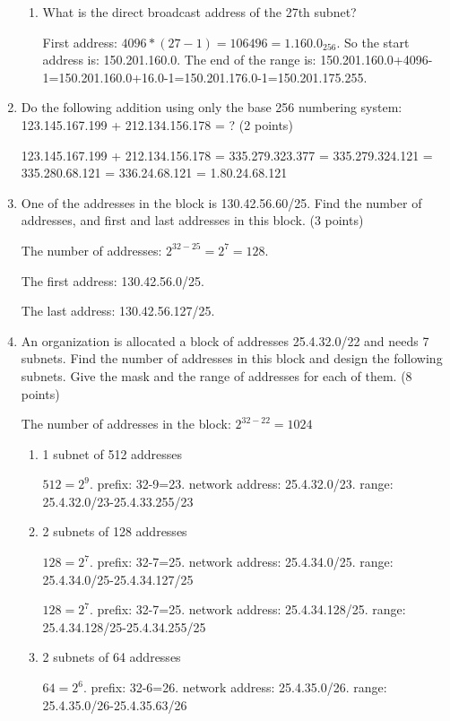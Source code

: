 \documentclass{article}
\begin{document}
\begin{enumerate}
\begin{enumerate}
    \item What is the direct broadcast address of the 27th subnet?
    
    First address: $4096*(27-1)=106496=1.160.0_{256}$. So the start address is: 150.201.160.0.
    The end of the range is: 150.201.160.0+4096-1=150.201.160.0+16.0-1=150.201.176.0-1=150.201.175.255.
  \end{enumerate}

  \item Do the following addition using only the base 256 numbering system: 123.145.167.199 + 212.134.156.178 = ? (2 points)

  123.145.167.199 + 212.134.156.178 = 335.279.323.377 = 335.279.324.121 = 335.280.68.121 = 336.24.68.121 = 1.80.24.68.121

  \item One of the addresses in the block is 130.42.56.60/25. Find the number of addresses, and first and last addresses in this block. (3 points)

  The number of addresses: $2^{32-25}=2^7=128$.

  The first address: 130.42.56.0/25.

  The last address: 130.42.56.127/25.

  \item An organization is allocated a block of addresses 25.4.32.0/22 and needs 7 subnets.
  Find the number of addresses in this block and design the following subnets.
  Give the mask and the range of addresses for each of them. (8 points)

  The number of addresses in the block: $2^{32-22}=1024$
  \begin{enumerate}
    \item 1 subnet of 512 addresses

    $512=2^{9}$. prefix: 32-9=23. network address: 25.4.32.0/23. range: 25.4.32.0/23-25.4.33.255/23

    \item 2 subnets of 128 addresses

    $128=2^{7}$. prefix: 32-7=25. network address: 25.4.34.0/25. range: 25.4.34.0/25-25.4.34.127/25

    $128=2^{7}$. prefix: 32-7=25. network address: 25.4.34.128/25. range: 25.4.34.128/25-25.4.34.255/25

    \item 2 subnets of 64 addresses

    $64=2^{6}$. prefix: 32-6=26. network address: 25.4.35.0/26. range: 25.4.35.0/26-25.4.35.63/26


\end{enumerate}
\end{enumerate}
\end{document}
